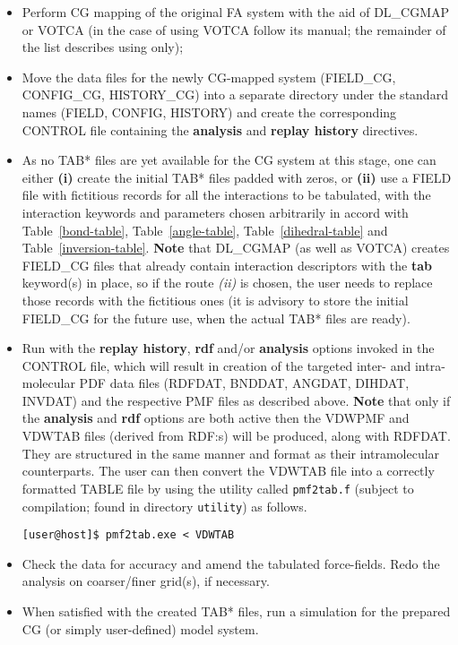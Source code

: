 \begin{itemize}
\item Perform CG mapping of the original FA system with the aid
of DL\_CGMAP or VOTCA (in the case of using VOTCA follow its manual;
the remainder of the list describes using \D only);
\item Move the data files for the newly CG-mapped system
(FIELD\_CG, CONFIG\_CG, HISTORY\_CG) into a separate directory
under the standard names (FIELD, CONFIG, HISTORY) and create
the corresponding CONTROL file containing the {\bf analysis}
and {\bf replay history} directives.
\item As no TAB* files are yet available for the CG system
at this stage, one can either {\bf (i)} create the initial TAB* files
padded with zeros, or {\bf (ii)} use a FIELD file with fictitious records
for all the interactions to be tabulated, with the interaction
keywords and parameters chosen arbitrarily in accord with
Table~\ref{bond-table}, Table~\ref{angle-table},
Table~\ref{dihedral-table} and Table~\ref{inversion-table}.
{\bf Note} that DL\_CGMAP (as well as VOTCA) creates FIELD\_CG files
that already contain interaction descriptors with the {\bf tab}
keyword(s) in place, so if the route {\em (ii)} is chosen,
the user needs to replace those records with the fictitious ones
(it is advisory to store the initial FIELD\_CG for the future
use, when the actual TAB* files are ready).
\item Run \D with the {\bf replay history}, {\bf rdf} and/or
{\bf analysis} options invoked in the CONTROL file, which
will result in creation of the targeted inter- and intra-molecular
PDF data files (RDFDAT, BNDDAT, ANGDAT, DIHDAT, INVDAT) and the
respective PMF files as described above.  {\bf Note} that only
if the {\bf analysis} and {\bf rdf} options are both active then 
the VDWPMF and VDWTAB files (derived from RDF:s) will be produced, 
along with RDFDAT.  They are structured in the same manner and format 
as their intramolecular counterparts.  The user can then convert the 
VDWTAB file into a correctly formatted TABLE file by using the utility 
called {\tt pmf2tab.f} (subject to compilation; found in \D directory
{\tt utility}) as follows.


\begin{verbatim}
[user@host]$ pmf2tab.exe < VDWTAB
\end{verbatim}

\item Check the data for accuracy and amend the tabulated
force-fields. Redo the analysis on coarser/finer grid(s),
if necessary.

\item When satisfied with the created TAB* files, run
a \D simulation for the prepared CG (or simply user-defined)
model system.
\end{itemize}
